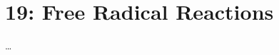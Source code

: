 

\chapter{19: Free Radical Reactions}\label{19: Free Radical Reactions}
\begin{adjustwidth}{1cm}{1cm}
  \dots
\end{adjustwidth}


